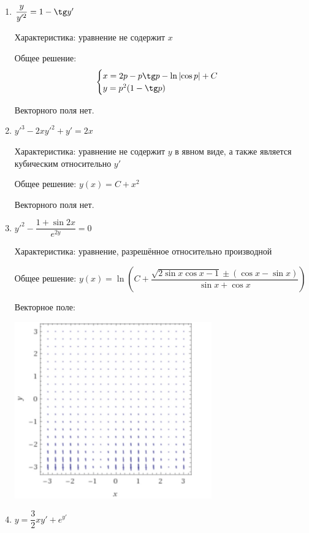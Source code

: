 \documentclass[14pt, a4paper]{extarticle}
\begin{document}
		\begin{enumerate}
			\item \(\dfrac{y}{y'^{2}} = 1 - \tg y'\) 
			
				Характеристика: уравнение не содержит \(x\)
				
				Общее решение:
				\begin{align*}
					\begin{cases}
						x = 2p - p\tg p - \ln \left|\cos p\right| + C \\
						y = p^2 (1 - \tg p)
					\end{cases}
				\end{align*}
				
				Векторного поля нет.
				
			\item \(y'^{3} - 2xy'^{2} + y' = 2x\)
				
				Характеристика: уравнение не содержит $y$ в явном виде, а также является кубическим относительно $y'$
				
				Общее решение: \(y(x) = C + x^{2}\)
				
				Векторного поля нет.
				
			\item \(y'^{2} - \dfrac{1 + \sin 2x}{e^{2y}} = 0\)
			
				Характеристика: уравнение, разрешённое относительно производной
			
				Общее решение: \( y(x) = \ln\left(C + \dfrac{\sqrt{2\sin x \cos x - 1} \pm \left( \cos x - \sin x\right)}{\sin x + \cos x}\right)\)
			
				Векторное поле:

				\hspace{-1cm}\includegraphics[width=8.5cm]{vector_3}
				\pagebreak
				
			\item \(y = \dfrac{3}{2} xy' + e^{y'}\)
			

\end{enumerate}
\end{document}
